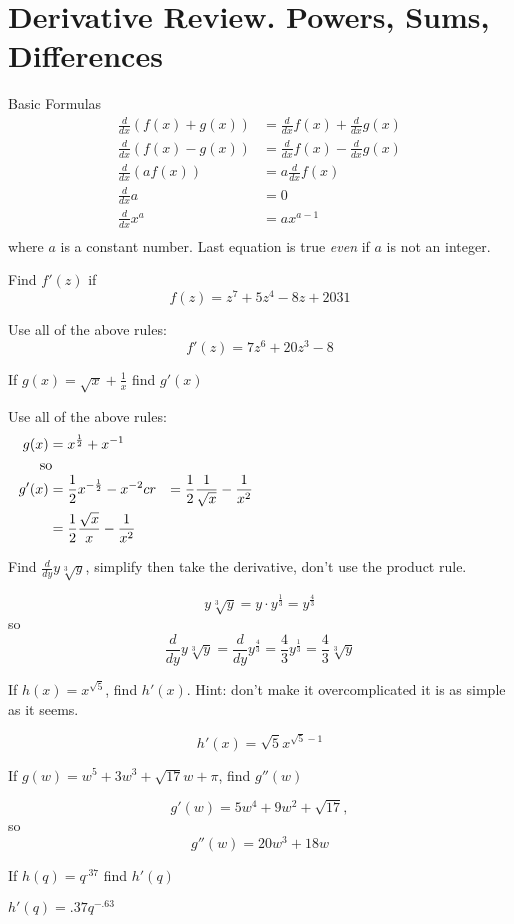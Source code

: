 \section*{Derivative Review. Powers, Sums, Differences}

Basic Formulas
\begin{equation}
  \begin{aligned}
    \frac{d}{dx} \left(f(x)+g(x)\right) &= \frac{d}{dx} f(x)+\frac{d}{dx} g(x) \\
    \frac{d}{dx} \left(f(x)-g(x)\right) &= \frac{d}{dx} f(x)-\frac{d}{dx} g(x) \\
    \frac{d}{dx} \left(af(x)\right) &= a\frac{d}{dx} f(x) \\
    \frac{d}{dx} a &= 0 \\
    \frac{d}{dx} x^a &= ax^{a-1} \\
  \end{aligned}
\end{equation}
where $a$ is a constant number. Last equation is true {\it even} if $a$ is not an integer.
  
\begin{questions}
\question
Find $f'(z)$ if
$$f(z)=z^7+5z^4-8z+2031$$
\begin{solution}[1.5in]
  Use all of the above rules:
  $$f'(z)=7z^6+20z^3-8$$
\end{solution}
\question
If $\displaystyle{g(x) = \sqrt{x}+\frac{1}{x}}$ find $g'(x)$
\begin{solution}[1.5in]
  Use all of the above rules:
  \begin{equation}
    \begin{aligned}
    g(x) &= x^{\frac{1}{2}}+ x^{-1}\cr
    \noalign{so}
    g'(x)&= \frac{1}{2}x^{-\frac{1}{2}} - x^{-2}cr
    &= \frac{1}{2}\frac{1}{\sqrt{x}} - \frac{1}{x^2}\cr
    &= \frac{1}{2}\frac{\sqrt{x}}{x} - \frac{1}{x^2}\cr
    \end{aligned}
  \end{equation}
\end{solution}
\question
Find $\displaystyle{\frac{d}{dy} y\sqrt[3]{y}}$, simplify then take the derivative, don't use the product rule.
\begin{solution}[1.5in]
  $$y\sqrt[3]{y}=y\cdot y^{\frac{1}{3}}=y^{\frac{4}{3}}$$
    so
    $$\frac{d}{dy} y\sqrt[3]{y} = \frac{d}{dy} y^{\frac{4}{3}} = \frac{4}{3}y^{\frac{1}{3}} = \frac{4}{3}\sqrt[3]{y}$$
\end{solution}
\newpage
\question
If $h(x)=x^{\sqrt{5}}$, find $h'(x)$. Hint: don't make it overcomplicated it is as simple as it seems.
\begin{solution}[1.5in]
  $$h'(x)=\sqrt{5}x^{\sqrt{5}-1}$$
\end{solution}
\question
If $g(w) = w^5+3w^3+\sqrt{17}w+\pi$, find $g''(w)$
\begin{solution}[1.5in]
  $$g'(w)=5w^4+9w^2+\sqrt{17},$$ so
  $$g''(w)=20w^3+18w$$
\end{solution}
\question
If $h(q) = q^{.37}$ find $h'(q)$
\begin{solution}[1.5in]
  $h'(q)=.37q^{-.63}$
\end{solution}
\end{questions}
